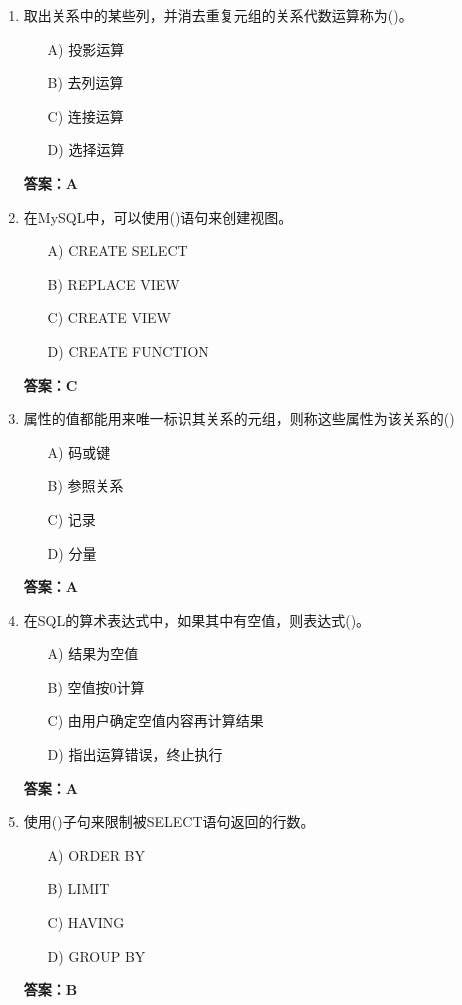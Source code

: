 \documentclass[a4paper,12pt]{article}
\begin{document}
\begin{enumerate}[label=\arabic*.]
\item 取出关系中的某些列，并消去重复元组的关系代数运算称为()。
\begin{itemize}
    \item[A)] 投影运算
    \item[B)] 去列运算
    \item[C)] 连接运算
    \item[D)] 选择运算
\end{itemize}
\textbf{答案：A}

\item 在MySQL中，可以使用()语句来创建视图。
\begin{itemize}
    \item[A)] CREATE SELECT
    \item[B)] REPLACE VIEW
    \item[C)] CREATE VIEW
    \item[D)] CREATE FUNCTION
\end{itemize}
\textbf{答案：C}

\item 属性的值都能用来唯一标识其关系的元组，则称这些属性为该关系的()
\begin{itemize}
    \item[A)] 码或键
    \item[B)] 参照关系
    \item[C)] 记录
    \item[D)] 分量
\end{itemize}
\textbf{答案：A}

\item 在SQL的算术表达式中，如果其中有空值，则表达式()。
\begin{itemize}
    \item[A)] 结果为空值
    \item[B)] 空值按0计算
    \item[C)] 由用户确定空值内容再计算结果
    \item[D)] 指出运算错误，终止执行
\end{itemize}
\textbf{答案：A}

\item 使用()子句来限制被SELECT语句返回的行数。
\begin{itemize}
    \item[A)] ORDER BY
    \item[B)] LIMIT
    \item[C)] HAVING
    \item[D)] GROUP BY
\end{itemize}
\textbf{答案：B}


\end{enumerate}
\end{document}
